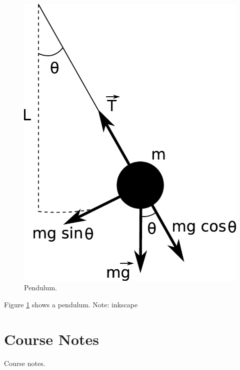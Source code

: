 \begin{figure}[ht!]
	\centering
	\includegraphics[width=.6\textwidth]{images/01pendulum}
	\caption{Pendulum.}
	\label{fig:01pendulum}
\end{figure}

Figure \ref{fig:01pendulum} shows a pendulum. Note: inkscape

\section{Course Notes}
Course notes.
